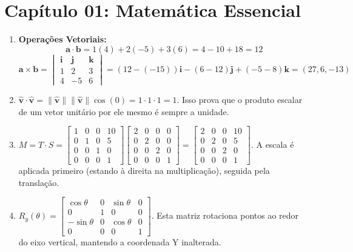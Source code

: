 \section*{Capítulo 01: Matemática Essencial}
\begin{enumerate}
    \item \textbf{Operações Vetoriais:}
    \begin{equation}
    \mathbf{a} \cdot \mathbf{b} = 1(4) + 2(-5) + 3(6) = 4 - 10 + 18 = 12
    \end{equation}
    \begin{equation}
    \mathbf{a} \times \mathbf{b} = \begin{vmatrix} \mathbf{i} & \mathbf{j} & \mathbf{k} \\ 1 & 2 & 3 \\ 4 & -5 & 6 \end{vmatrix} = (12 - (-15))\mathbf{i} - (6 - 12)\mathbf{j} + (-5 - 8)\mathbf{k} = (27, 6, -13)
    \end{equation}
    \item $\hat{\mathbf{v}} \cdot \hat{\mathbf{v}} = \|\hat{\mathbf{v}}\| \|\hat{\mathbf{v}}\| \cos(0) = 1 \cdot 1 \cdot 1 = 1$. Isso prova que o produto escalar de um vetor unitário por ele mesmo é sempre a unidade.
    \item $M = T \cdot S = \begin{bmatrix} 1 & 0 & 0 & 10 \\ 0 & 1 & 0 & 5 \\ 0 & 0 & 1 & 0 \\ 0 & 0 & 0 & 1 \end{bmatrix} \begin{bmatrix} 2 & 0 & 0 & 0 \\ 0 & 2 & 0 & 0 \\ 0 & 0 & 2 & 0 \\ 0 & 0 & 0 & 1 \end{bmatrix} = \begin{bmatrix} 2 & 0 & 0 & 10 \\ 0 & 2 & 0 & 5 \\ 0 & 0 & 2 & 0 \\ 0 & 0 & 0 & 1 \end{bmatrix}$. A escala é aplicada primeiro (estando à direita na multiplicação), seguida pela translação.
    \item $R_y(\theta) = \begin{bmatrix} \cos\theta & 0 & \sin\theta & 0 \\ 0 & 1 & 0 & 0 \\ -\sin\theta & 0 & \cos\theta & 0 \\ 0 & 0 & 0 & 1 \end{bmatrix}$. Esta matriz rotaciona pontos ao redor do eixo vertical, mantendo a coordenada Y inalterada.

\end{enumerate}
